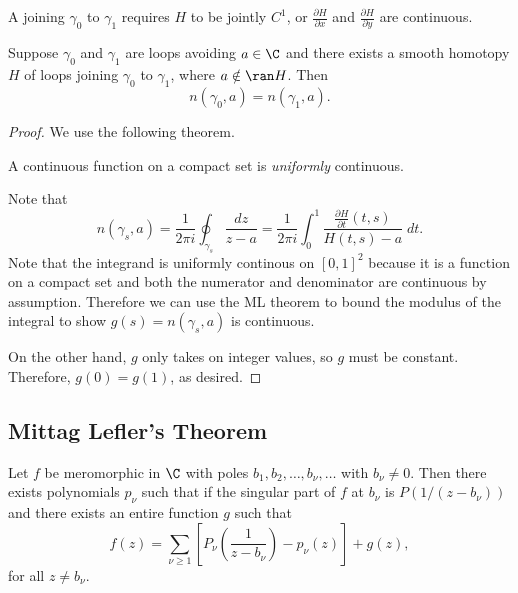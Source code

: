 \begin{definition}
    A  joining $\gamma_0$ to $\gamma_1$
    requires $H$ to be jointly $C^1$, or $\frac{\partial H}{\partial x}$ and $\frac{\partial H}{\partial y}$ are continuous.
\end{definition}

\begin{theorem}
    Suppose $\gamma_0$ and $\gamma_1$ are loops avoiding 
    $a \in \C$ and there exists a smooth homotopy $H$ of loops
    joining $\gamma_0$ to $\gamma_1$, where $a \notin \ran H$.
    Then
    \[ n(\gamma_0, a) = n(\gamma_1, a). \]
\end{theorem}

\begin{proof}
    We use the following theorem.
    \begin{theorem*}
        A continuous function on a compact set is \textit{uniformly}
        continuous.
    \end{theorem*}
    Note that
    \[ n(\gamma_s, a) = \frac{1}{2\pi i} \oint_{\gamma_s} 
\frac{dz}{z-a} = \frac{1}{2\pi i} \int_0^1 \frac{\frac{\partial H}{\partial t}(t, s)}{H(t, s) - a} \; dt. \]
Note that the integrand is uniformly continous on ${[0,1]}^2$ because it
    is a function on a compact set and both the numerator and
    denominator are continuous by assumption.
    Therefore we can use the ML theorem to bound the modulus
    of the integral to show $g(s)=n(\gamma_s, a)$ is continuous.
    
    On the other hand, $g$ only takes on integer values,
    so $g$ must be constant.
    Therefore, $g(0) = g(1)$, as desired.
\end{proof}

\subsection{Mittag Lefler's Theorem}
\begin{theorem}
    Let $f$ be meromorphic in $\C$ with poles $b_1, b_2, \ldots,
    b_{\nu}, \ldots$ with $b_{\nu} \ne 0$.
    Then there exists polynomials $p_{\nu}$ such that if the
    singular part of $f$ at $b_{\nu}$ is $P(1/(z-b_{\nu}))$
    and there exists an entire function $g$ such that
\[ f(z) = \sum_{\nu \ge 1} \left[ P_{\nu} \left( \frac{1}{z-b_{\nu}}\right) - p_{\nu}(z)\right] + g(z), \]
    for all $z \ne b_{\nu}$.
\end{theorem}
